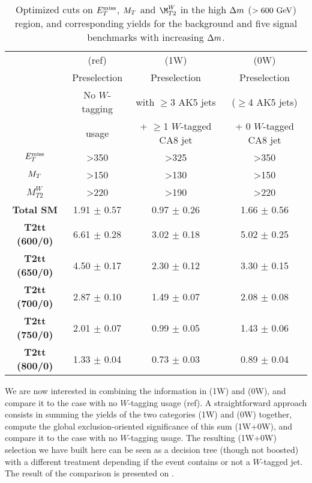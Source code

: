         \begin{table}
            \centering
            \begin{tabular}{c|c|cc}
                                       & (ref)             & (1W)                         & (0W)                    \\
                                       & Preselection      & Preselection                 & Preselection           \\
                                       & No $W$-tagging    & with $\geq$3 AK5 jets        & ($\geq$4 AK5 jets)     \\
                                       & usage             & + $\geq$1 $W$-tagged CA8 jet & + 0 $W$-tagged CA8 jet \\
                \hline
                \textbf{$E_T^\text{miss}$}        & >350              & >325 & >350 \\
                \textbf{$M_T$}         & >150              & >130 & >150 \\
                \textbf{$M_{T2}^{W}$}  & >220              & >190 & >220 \\
                \hline
                \hline
                \textbf{Total SM}      & 1.91 $\pm$ 0.57   & 0.97 $\pm$ 0.26     &  1.66 $\pm$ 0.56    \\
                \hline
                \textbf{T2tt (600/0)}   & 6.61 $\pm$ 0.28  & 3.02 $\pm$ 0.18     &  5.02 $\pm$ 0.25    \\
                \textbf{T2tt (650/0)}   & 4.50 $\pm$ 0.17  & 2.30 $\pm$ 0.12     &  3.30 $\pm$ 0.15    \\
                \textbf{T2tt (700/0)}   & 2.87 $\pm$ 0.10  & 1.49 $\pm$ 0.07     &  2.08 $\pm$ 0.08    \\
                \textbf{T2tt (750/0)}   & 2.01 $\pm$ 0.07  & 0.99 $\pm$ 0.05     &  1.43 $\pm$ 0.06    \\
                \textbf{T2tt (800/0)}   & 1.33 $\pm$ 0.04  & 0.73 $\pm$ 0.03     &  0.89 $\pm$ 0.04
            \end{tabular}
            \caption{Optimized cuts on $E_T^\text{miss}$, $M_T$ and $\M_{T2}^{W}$ in the high $\Delta m$
                     ($> 600~\text{GeV}$) region, and corresponding yields for the background and five signal
                     benchmarks with increasing $\Delta m$.}
                     \label{tab:wTaggingAnalysisCuts}
        \end{table}

        We are now interested in combining the information in (1W) and (0W), and compare
        it to the case with no $W$-tagging usage (ref). A straightforward approach consists
        in summing the yields of the two categories (1W) and (0W) together, compute
        the global exclusion-oriented significance of this sum (1W+0W), and compare it to
        the case with no $W$-tagging usage. The resulting (1W+0W) selection we have built
        here can be seen as a decision tree (though not boosted) with a different treatment
        depending if the event contains or not a $W$-tagged jet. The result of the comparison
        is presented on .

